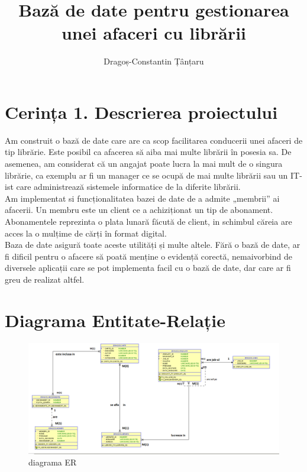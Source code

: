 \documentclass[12pt]{article}
\title{Bază de date pentru gestionarea unei afaceri cu librării}
\author{Dragoș-Constantin Țânțaru}
\begin{document}
\maketitle
\thispagestyle{fancy} 
\section{Cerința 1. Descrierea proiectului}
Am construit o bază de date care are ca scop facilitarea conducerii unei afaceri de tip librărie. Este posibil ca afacerea să aiba mai multe librării în posesia sa. De asemenea, am considerat că un angajat poate lucra la mai mult de o singura librărie, ca exemplu ar fi un manager ce se ocupă de mai multe librării sau un IT-ist care administrează sistemele informatice de la diferite librării.\\
Am implementat si funcționalitatea bazei de date de a admite „membrii” ai afacerii. Un membru este un client ce a achiziționat un tip de abonament. Abonamentele reprezinta o plata lunară făcută de client, in schimbul căreia are acces la o mulțime de cărți în format digital.\\
Baza de date asigură toate aceste utilități și multe altele. Fără o bază de date, ar fi dificil pentru o afacere să poată menține o evidență corectă, nemaivorbind de diversele aplicații care se pot implementa facil cu o bază de date, dar care ar fi greu de realizat altfel.
\section{Diagrama Entitate-Relație}
\begin{figure}[!htb]
	\includegraphics[max width=\linewidth]{imgs/diagER.png}
	\caption{diagrama ER}
	\label{fig:ER}
\end{figure}
\end{document}
